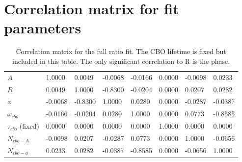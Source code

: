 \section{Correlation matrix for fit parameters}

\begin{table}[H]
\setlength\tabcolsep{0pt}
\begin{tabular*}{\linewidth}{@{\extracolsep{\fill}}lLBLLLLL{c}}
  \toprule
            &  &  & \thead{$\phi$} &  &  &  &  \\
  \midrule
	$A$    			 	 &  1.0000  &  0.0049  & -0.0068  & -0.0166  &  0.0000  & -0.0098  &  0.0233  \\
	$R$     			 &  0.0049  &  1.0000  & -0.8300  & -0.0204  &  0.0000  &  0.0207  &  0.0282  \\
	$\phi$   			 & -0.0068  & -0.8300  &  1.0000  &  0.0280  &  0.0000  & -0.0287  & -0.0387  \\
	$\omega_{cbo}$   	 & -0.0166  & -0.0204  &  0.0280  &  1.0000  &  0.0000  &  0.0773  & -0.8585  \\
	$\tau_{cbo}$ (fixed) &  0.0000  &  0.0000  &  0.0000  &  0.0000  &  1.0000  &  0.0000  &  0.0000  \\
	$N_{cbo-A}$   	 	 & -0.0098  &  0.0207  & -0.0287  &  0.0773  &  0.0000  &  1.0000  & -0.0656  \\
	$N_{cbo-\phi}$   	 &  0.0233  &  0.0282  & -0.0387  & -0.8585  &  0.0000  & -0.0656  &  1.0000  \\
  \bottomrule
\end{tabular*}
\caption{Correlation matrix for the full ratio fit. The CBO lifetime is fixed but included in this table. The only significant correlation to R is the \gmtwo phase.}
\end{table}


